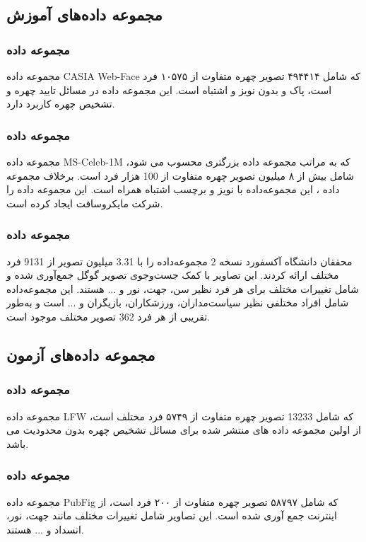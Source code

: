 \subsection{مجموعه داده‌های آموزش}
\subsubsection{مجموعه داده }
مجموعه داده CASIA Web-Face که شامل ۴۹۴۴۱۴ تصویر چهره متفاوت از ۱۰۵۷۵ فرد است، پاک و بدون نویز و اشتباه است. این مجموعه داده در مسائل تایید چهره و تشخیص چهره کاربرد دارد. \cite{CASIA_dataset}

\subsubsection{مجموعه داده }
مجموعه داده MS-Celeb-1M  که به مراتب مجموعه داده بزرگتری محسوب می شود، شامل بیش از ۸ میلیون تصویر چهره متفاوت از 100 هزار فرد است. برخلاف مجموعه داده ، این مجموعه‌داده با نویز و برچسب اشتباه همراه است. این مجموعه داده را شرکت مایکروسافت ایجاد کرده است. \cite{MS_Celeb_dataset}

\subsubsection{مجموعه داده }
محققان دانشگاه آکسفورد نسخه 2 مجموعه‌داده‌  را با 3.31 میلیون تصویر از 9131 فرد مختلف ارائه کردند. این تصاویر با کمک جست‌و‌جوی تصویر گوگل جمع‌آوری ‌شده و شامل تغییرات مختلف برای هر فرد نظیر سن، جهت، نور و ... هستند. این مجموعه‌داده شامل افراد مختلفی نظیر سیاست‌مداران، ورزشکاران، بازیگران و ... است و به‌طور تقریبی از هر فرد 362 تصویر مختلف موجود است. \cite{VGGFace2_dataset}

\subsection{مجموعه داده‌های آزمون}
\subsubsection{مجموعه داده }
مجموعه داده LFW  که شامل 13233 تصویر چهره متفاوت از ۵۷۴۹ فرد مختلف است، از اولین مجموعه داده های منتشر شده برای مسائل تشخیص چهره بدون محدودیت می باشد. \cite{LFW_dataset}

\subsubsection{مجموعه داده }
مجموعه داده PubFig  که شامل ۵۸۷۹۷ تصویر چهره متفاوت از ۲۰۰ فرد است، از اینترنت جمع آوری شده است. این تصاویر شامل تغییرات مختلف مانند جهت، نور، انسداد و ... هستند. \cite{PubFig_dataset}

